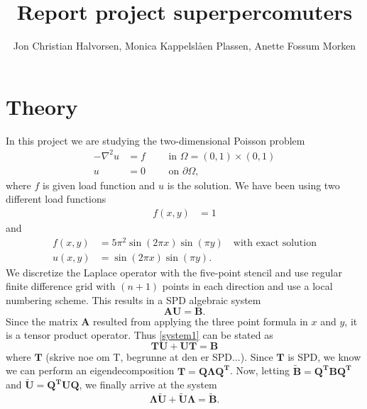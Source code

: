 \documentclass[10pt, a4paper]{article} %
\title{Report project superpercomuters}
\author[]{Jon Christian Halvorsen, Monica Kappelslåen Plassen, Anette Fossum Morken}
\date{}
\begin{document}
\maketitle



\section*{Theory}
In this project we are studying the two-dimensional Poisson problem
\begin{align}
-\nabla^2u&=f \quad\quad\text{ in } \Omega=(0,1)\times(0,1)\\
u&=0 \quad\quad\text{ on } \partial \Omega, \nonumber
\label{Poisson}
\end{align}
where $f$ is given load function and $u$ is the solution. We have been using two different load functions
\begin{align*}
f(x,y)&=1
\end{align*}
and
\begin{align}
f(x,y)&=5\pi^2\sin(2\pi x)\sin(\pi y) \quad\text{with exact solution} \\
u(x,y)&=\sin(2\pi x)\sin(\pi y).\nonumber
\label{loadfunc2}
\end{align}
We discretize the Laplace operator with the five-point stencil and use regular finite difference grid with $(n+1)$ points in each direction and use a local numbering scheme. This results in a SPD algebraic system
\begin{equation}
	\mathbf{AU} = \mathbf{B}.
	\label{system1}
\end{equation}
Since the matrix $\mathbf{A}$ resulted from applying the three point formula in $x$ and $y$, it is a tensor product operator. Thus \eqref{system1} can be stated as 
\begin{equation}
	\mathbf{TU} + \mathbf{UT} = \mathbf{B}
\end{equation}
where $\mathbf{T}$ (skrive noe om T, begrunne at den er SPD...). Since $\mathbf{T}$ is SPD, we know we can perform an eigendecomposition $\mathbf{T} = \mathbf{Q\Lambda Q^T}$. Now, letting $\mathbf{\widetilde{B}} = \mathbf{Q^TBQ^T}$ and $\mathbf{\widetilde{U}} = \mathbf{Q^TUQ}$, we finally arrive at the system 
\begin{equation}
	\mathbf{\Lambda\widetilde{U}} + \mathbf{\widetilde{U}\Lambda} = \mathbf{\widetilde{B}}.
	\label{system2}
\end{equation}
\end{document}
